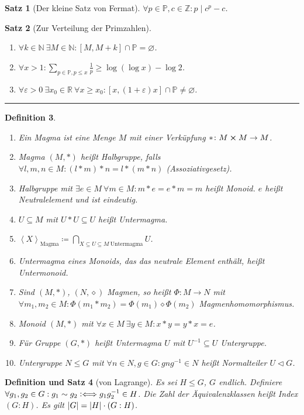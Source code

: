 \documentclass[a4paper]{article}
\newcounter{Sec}
\theoremstyle{marginbreak}
\newtheorem{definition}{Definition}[Sec]
\newtheorem{satz}[definition]{Satz}
\newtheorem{defsatz}[definition]{Definition und Satz}
\newcommand{\sep}{%
	\rule{\textwidth}{0.3pt}%
	\stepcounter{Sec}%
	}
\newcommand{\defiff}{\mathrel{\vcentcolon\Longleftrightarrow}}
\newcommand\divides\mid
\newcommand{\Z}{\mathbb{Z}}
\newcommand{\N}{\mathbb{N}}
\renewcommand{\P}{\mathbb{P}}
\newcommand{\R}{\mathbb{R}}
\newcommand\gen[2][]{\left\langle#2\right\rangle_{\text{#1}}}
\newcommand\nt\triangleleft
\begin{document}
\begin{satz}[Der kleine Satz von Fermat]
	$\forall p\in\P, c\in\Z: p\divides c^p-c$.
\end{satz}
\begin{satz}[Zur Verteilung der Primzahlen]
	\begin{enumerate}[label=(\alph*)]
		\item $\forall k\in\N~\exists M\in\N: [M, M+k]\cap\P=\varnothing$.
		\item $\forall x>1:\sum_{p\in\P, p\leq x}\frac{1}{p}\geq\log(\log x)-\log 2$.
		\item $\forall\varepsilon>0~\exists x_0\in\R~\forall x\geq x_0: [x, (1+\varepsilon)x]\cap\P\neq\varnothing$.
	\end{enumerate}
\end{satz}
\sep
\begin{definition}
	\begin{enumerate}[label=(\alph*)]
		\item Ein Magma ist eine Menge $M$ mit einer Verküpfung $*\colon M\cross M\to M$.
		\item Magma $(M, *)$ heißt Halbgruppe, falls $\forall l, m, n\in M: (l*m)*n=l*(m*n)$ (Assoziativgesetz).
		\item Halbgruppe mit $\exists e\in M~\forall m\in M: m*e=e*m=m$ heißt Monoid. $e$ heißt Neutralelement und ist eindeutig.
		\item $U\subseteq M$ mit $U*U\subseteq U$ heißt Untermagma.
		\item $\gen[Magma]{X}\coloneqq \bigcap_{X\subseteq U\subseteq M~\text{Untermagma}}U$.
		\item Untermagma eines Monoids, das das neutrale Element enthält, heißt Untermonoid.
		\item Sind $(M, *)$, $(N,\diamond)$ Magmen, so heißt $\Phi\colon M\to N$ mit
			$\forall m_1, m_2\in M:\Phi(m_1*m_2)=\Phi(m_1)\diamond\Phi(m_2)$ Magmenhomomorphismus.
		\item Monoid $(M, *)$ mit $\forall x\in M~\exists y\in M: x*y=y*x=e$.
		\item Für Gruppe $(G, *)$ heißt Untermagma $U$ mit $U^{-1}\subseteq U$ Untergruppe.
		\item Untergruppe $N\leq G$ mit $\forall n\in N, g\in G: gng^{-1}\in N$ heißt Normalteiler $U\nt G$.
	\end{enumerate}
\end{definition}
\begin{defsatz}[von Lagrange]
	Es sei $H\leq G$, $G$ endlich. Definiere $\forall g_1, g_2\in G: g_1\sim g_2\defiff g_1g_2^{-1}\in H$.
	Die Zahl der Äquivalenzklassen heißt Index $(G:H)$. Es gilt $\abs{G}=\abs{H}\cdot (G:H)$.
\end{defsatz}
\end{document}

